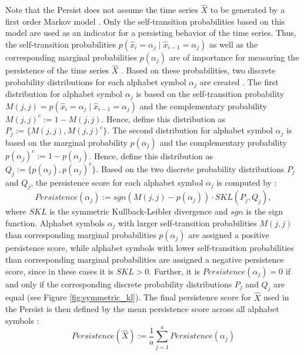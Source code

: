 Note that the Persist does not assume the time series $\hat{X}$ to be generated by a first order Markov model \cite{Persist}. Only the self-transition probabilities based on this model are used as an indicator for a persisting behavior of the time series. \newline
Thus, the self-transition probabilities $p(\hat{x}_i = \alpha_j \mid \hat{x}_{i-1} = \alpha_j)$ as well as the corresponding marginal probabilities $p(\alpha_j)$ are of importance for measuring the persistence of the time series $\hat{X}$ \cite{Persist}. Based on these probabilities, two discrete probability distributions for each alphabet symbol $\alpha_j$ are created \cite{Persist}. The first distribution for alphabet symbol $\alpha_j$ is based on the self-transition probability $M(j,j) = p(\hat{x}_i = \alpha_j \mid \hat{x}_{i-1} = \alpha_j)$ and the complementary probability $M(j,j)^c := 1 - M(j,j)$. Hence, define this distribution as $P_j := \{M(j,j), M(j,j)^c\}$. The second distribution for alphabet symbol $\alpha_j$ is based on the marginal probability $p(\alpha_j)$ and the complementary probability $p(\alpha_j)^c := 1 - p(\alpha_j)$. Hence, define this distribution as $Q_j := \{p(\alpha_j), p(\alpha_j)^c\}$. \newline
Based on the two discrete probability distributions $P_j$ and $Q_j$, the persistence score for each alphabet symbol $\alpha_j$ is computed by \cite{Persist}:
\begin{equation}
Persistence(\alpha_j) := sgn(M(j,j)-p(\alpha_j)) \cdot SKL(P_j,Q_j),
\label{eq:persistence_symbol}
\end{equation}
where $SKL$ is the symmetric Kullback-Leibler divergence and $sgn$ is the sign function. Alphabet symbols $\alpha_j$ with larger self-transition probabilities $M(j,j)$ than corresponding marginal probabilities $p(\alpha_j)$ are assigned a positive persistence score, while alphabet symbols with lower self-transition probabilities than corresponding marginal probabilities are assigned a negative persistence score, since in these cases it is $SKL > 0$. Further, it is $Persistence(\alpha_j) = 0$ if and only if the corresponding discrete probability distributions $P_j$ and $Q_j$ are equal \cite{Persist} (see Figure \ref{fig:symmetric_kl}). \newline
The final persistence score for $\hat{X}$ used in the Persist is then defined by the mean persistence score across all alphabet symbols \cite{Persist}:
\begin{equation}
Persistence(\hat{X}) := \frac{1}{a} \sum_{j=1}^{a} Persistence(\alpha_j)
\label{eq:persistence}
\end{equation}
